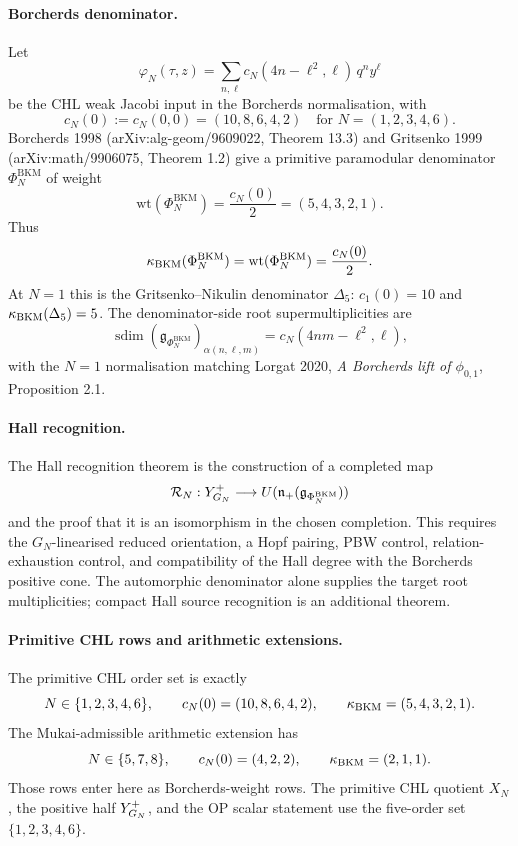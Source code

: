 \paragraph{Borcherds denominator.}
Let
\[
  \varphi_N(\tau,z)=
  \sum_{n,\ell}c_N(4n-\ell^2,\ell)\,q^n y^\ell
\]
be the CHL weak Jacobi input in the Borcherds normalisation, with
\[
  c_N(0):=c_N(0,0)=(10,8,6,4,2)
  \quad\text{for }N=(1,2,3,4,6).
\]
Borcherds 1998 (arXiv:alg-geom/9609022, Theorem 13.3) and
Gritsenko 1999 (arXiv:math/9906075, Theorem 1.2) give a primitive
paramodular denominator $\Phi_N^{\mathrm{BKM}}$ of weight
\[
  \mathrm{wt}(\Phi_N^{\mathrm{BKM}})
  =
  \frac{c_N(0)}{2}
  =
  (5,4,3,2,1) .
\]
Thus
\[
  \kappa_{\mathrm{BKM}}(\Phi_N^{\mathrm{BKM}})
  =
  \mathrm{wt}(\Phi_N^{\mathrm{BKM}})
  =
  \frac{c_N(0)}{2}.
\]
At $N=1$ this is the Gritsenko--Nikulin denominator $\Delta_5$:
$c_1(0)=10$ and $\kappa_{\mathrm{BKM}}(\Delta_5)=5$.  The denominator-side root
supermultiplicities are
\[
  \operatorname{sdim}
  (\mathfrak{g}_{\Phi_N^{\mathrm{BKM}}})_{\alpha(n,\ell,m)}
  =
  c_N(4nm-\ell^2,\ell),
\]
with the $N=1$ normalisation matching Lorgat 2020,
\emph{A Borcherds lift of $\phi_{0,1}$}, Proposition 2.1.

\paragraph{Hall recognition.}
The Hall recognition theorem is the construction of a completed map
\[
  \mathcal{R}_N:Y^{+}_{G_N}
  \longrightarrow
  U(\mathfrak{n}_{+}(\mathfrak{g}_{\Phi_N^{\mathrm{BKM}}}))
\]
and the proof that it is an isomorphism in the chosen completion.  This
requires the $G_N$-linearised reduced orientation, a Hopf pairing, PBW
control, relation-exhaustion control, and compatibility of the Hall
degree with the Borcherds positive cone.  The automorphic denominator
alone supplies the target root multiplicities; compact Hall source
recognition is an additional theorem.

\paragraph{Primitive CHL rows and arithmetic extensions.}
The primitive CHL order set is exactly
\[
  N\in\{1,2,3,4,6\},
  \qquad
  c_N(0)=(10,8,6,4,2),
  \qquad
  \kappa_{\mathrm{BKM}}=(5,4,3,2,1).
\]
The Mukai-admissible arithmetic extension has
\[
  N\in\{5,7,8\},
  \qquad
  c_N(0)=(4,2,2),
  \qquad
  \kappa_{\mathrm{BKM}}=(2,1,1).
\]
Those rows enter here as Borcherds-weight rows.  The primitive CHL
quotient $X_N$, the positive half $Y^{+}_{G_N}$, and the OP scalar
statement use the five-order set $\{1,2,3,4,6\}$.


